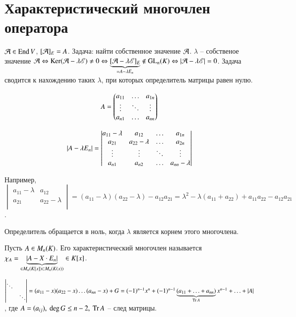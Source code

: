 \documentclass[main]{subfiles}
\begin{document}
\chapter{Характеристический многочлен оператора}

$\mathcal{A} \in \operatorname{End} V$, $[\mathcal{A}]_E = A$.
Задача: найти собственное значение $\mathcal{A}$.
$\lambda$ -- собственое значение $\mathcal{A} \Leftrightarrow
    \operatorname{Ker}(\mathcal{A} - \lambda\mathscr{E}) \neq 0 \Leftrightarrow
    \underbrace{[\mathcal{A} - \lambda\mathscr{E}]_E}_{=A-\lambda E_n} \not\in \operatorname{GL}_n(K) \Leftrightarrow |\mathcal{A} - \lambda\mathscr{E}| = 0$. Задача сводится к нахождению таких
$\lambda$, при которых определитель матрицы равен нулю.


\[A = \begin{pmatrix}
        a_{11} & \ldots & a_{1n} \\
        \vdots & \ddots & \vdots \\
        a_{n1} & \ldots & a_{nn} \\
    \end{pmatrix}\]

\[|A - \lambda E_n| = \begin{vmatrix}
        a_{11} - \lambda & a_{12}           & \ldots & a_{1n}           \\
        a_{21}           & a_{22} - \lambda & \ldots & a_{2n}           \\
        \vdots           & \vdots           & \ddots & \vdots           \\
        a_{n1}           & a_{n2}           & \ldots & a_{nn} - \lambda \\
    \end{vmatrix}\]


Например, $\begin{vmatrix}
        a_{11} - \lambda & a_{12}           \\
        a_{21}           & a_{22} - \lambda \\
    \end{vmatrix} = (a_{11} - \lambda)(a_{22} - \lambda) - a_{12} a_{21} =
    \lambda ^2 - \lambda(a_{11}+a_{22}) + a_{11}a_{22} - a_{12} a_{21}$.

Определитель обращается в ноль, когда $\lambda$
является корнем этого многочлена.

\begin{definition} 
    Пусть $A \in M_n(K)$. Его характеристический многочлен называется
    $\chi_A = \underbrace{|A - X\cdot E_n|}_{\in M_n(K[x])\subset M_n(K(x))} \in K[x]$.

    $\begin{vmatrix}
            \ddots &        \\
                   & \ddots \\
        \end{vmatrix} = (a_{11} - x)(a_{22} - x)\ldots(a_{nn} - x) + G =
        (-1)^{n-1}x^n+(-1)^{n-1}\underbrace{(a_{11}+\ldots+a_{nn})}_{\operatorname{Tr}A}x^{n-1}+\ldots+|A|$,
    где $\A= (a_{ij}),\ \deg G \leq n-2,\ \Tr\A$ -- след матрицы.
\end{definition}
\end{document}
